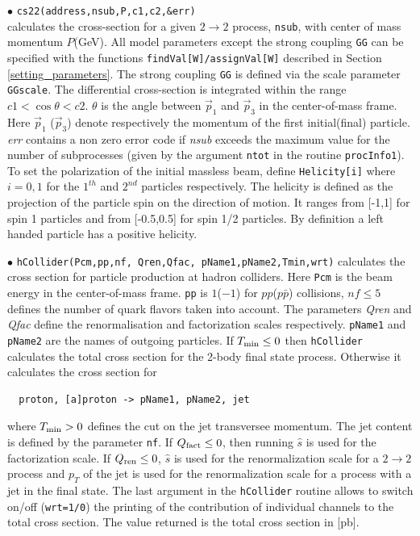 \documentclass[12pt,a4paper]{article}
\begin{document}
\noindent
$\bullet$ \verb|cs22(address,nsub,P,c1,c2,&err)|\\
calculates  the cross-section for a given $2\rightarrow 2$
process, \verb|nsub|, with  center of mass momentum $P$(GeV). 
All model parameters  except the strong coupling {\tt GG}
can be specified with the functions {\tt findVal[W]/assignVal[W]}
described in Section \ref{setting_parameters}. The strong coupling {\tt GG}
is defined via the scale parameter {\tt GGscale}.    
The
differential cross-section is integrated
 within the range  $ c1 < \cos\theta <c2 $. $\theta$ is
the angle between $\vec{p}_1$ and $\vec{p}_3$  in the
center-of-mass frame. Here $\vec{p}_1$ ($\vec{p}_3$) denote
respectively the momentum of the first initial(final) particle.
{\it err} contains a non zero error code if {\it nsub} exceeds the
maximum value  for the number of subprocesses (given by the
argument \verb|ntot| in the routine {\tt procInfo1}). To set the polarization 
of the initial massless beam, define   \verb|Helicity[i]|  where $i=0,1$ 
for the $1^{th}$ and $2^{nd}$ particles respectively.
The   helicity is defined as the projection of the particle spin
on the direction of motion. It ranges from  [-1,1] for spin 1 particles and 
from [-0.5,0.5]  for spin 1/2 particles.
By definition a left handed particle has a positive
helicity. 


\noindent$\bullet$ \verb|hCollider(Pcm,pp,nf, Qren,Qfac, pName1,pName2,Tmin,wrt)| 
calculates the cross
section for particle production at hadron colliders. Here \verb|Pcm| 
is the beam energy  in the center-of-mass frame. \verb|pp| is
$1$($-1$) for $pp$($p\bar{p}$) collisions, $ nf \le 5$  defines the
number of quark flavors taken into account.
The parameters  {\it Qren} and  {\it Qfac} define the renormalisation and factorization
 scales respectively. {\tt pName1} and {\tt pName2} are the names of outgoing
particles. If $T_{\rm min} \le 0 $ then {\tt hCollider} calculates the total  
cross section for the 2-body final state  process. Otherwise it calculates the cross
section for
\begin{verbatim}
  proton, [a]proton -> pName1, pName2, jet
\end{verbatim} 
where $ T_{\rm min}>0 $  defines the cut on the  jet transversee momentum. 
The jet content is defined by the  parameter \verb|nf|. 
If $Q_{\rm fact} \le 0 $, then  running  $\hat{s}$ is used for the
factorization  scale. If  $Q_{\rm ren} \le 0 $,  
$\hat{s}$ is used for the renormalization scale for a $2\to2$ process and $p_{T}$ of the jet is used for the renormalization scale for a process with a jet in the final state.
The last argument in the  {\tt hCollider} routine allows to switch
on/off ({\tt wrt=1/0}) the printing  of the contribution of individual channels to the total
cross section.   The value returned  is the total  cross section in [pb]. 
\end{document}
